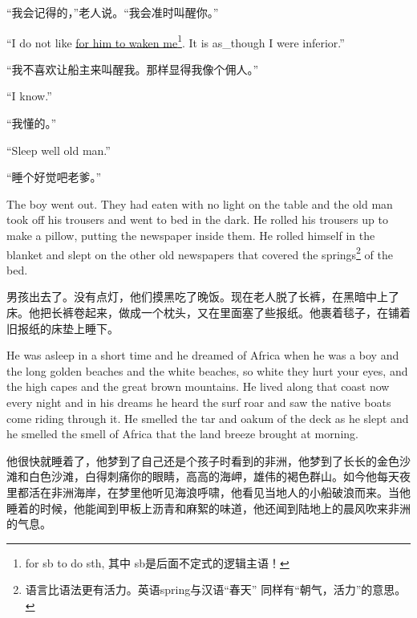 \begin{paracol}{2}
\switchcolumn

“我会记得的，”老人说。“我会准时叫醒你。”

\switchcolumn*

``I do not like \uline{for him to waken me}\footnote{for sb to do sth, 其中
  sb是后面不定式的逻辑主语！}. It is \gls{as_though} I were \gls{inferior}.''

\switchcolumn

“我不喜欢让船主来叫醒我。那样显得我像个佣人。”

\switchcolumn*

``I know.''

\switchcolumn

“我懂的。”

\switchcolumn*

``Sleep well old man.''

\switchcolumn

“睡个好觉吧老爹。”

\switchcolumn*

The boy went out. They had eaten with no light on the table and the old man
took off his trousers and went to bed in the dark. He \gls{rolled} his
trousers up to make a \gls{pillow}, putting the newspaper inside them. He
rolled himself in the blanket and slept on the other old newspapers that
covered the springs\footnote{语言比语法更有活力。英语spring与汉语“春天”
  同样有“朝气，活力”的意思。} of the bed.

\switchcolumn

男孩出去了。没有点灯，他们摸黑吃了晚饭。现在老人脱了长裤，在黑暗中上了床。他把长裤卷起来，做成一个枕头，又在里面塞了些报纸。他裹着毯子，在铺着旧报纸的床垫上睡下。

\switchcolumn*

He was asleep in a short time and he dreamed of \gls{Africa} when he was a
boy and the long golden beaches and the white beaches, so white they hurt
your eyes, and the high capes and the great brown mountains. He lived along
that coast now every night and in his dreams he heard the \gls{surf}
\gls{roar} and saw the \gls{native} boats come riding through it. He smelled
the \gls{tar} and \gls{oakum} of the \gls{deck} as he slept and he smelled
the smell of Africa that the land breeze brought at morning.

\switchcolumn

他很快就睡着了，他梦到了自己还是个孩子时看到的非洲，他梦到了长长的金色沙滩和白色沙滩，白得刺痛你的眼睛，高高的海岬，雄伟的褐色群山。如今他每天夜里都活在非洲海岸，在梦里他听见海浪呼啸，他看见当地人的小船破浪而来。当他睡着的时候，他能闻到甲板上沥青和麻絮的味道，他还闻到陆地上的晨风吹来非洲的气息。


\end{paracol}
